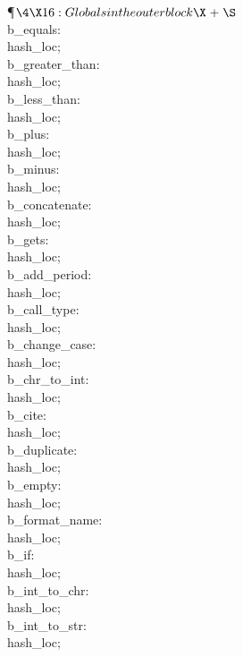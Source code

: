 \Y\P$\4\X16:Globals in the outer block\X\mathrel{+}\S$\6
\4\\{b\_equals}: \\{hash\_loc};\C{\.{=}}\6
\4\\{b\_greater\_than}: \\{hash\_loc};\C{\.{>}}\6
\4\\{b\_less\_than}: \\{hash\_loc};\C{\.{<}}\6
\4\\{b\_plus}: \\{hash\_loc};\6
\4\\{b\_minus}: \\{hash\_loc};\C{\.{-}}\6
\4\\{b\_concatenate}: \\{hash\_loc};\C{\.{*}}\6
\4\\{b\_gets}: \\{hash\_loc};\6
\4\\{b\_add\_period}: \\{hash\_loc};\6
\4\\{b\_call\_type}: \\{hash\_loc};\6
\4\\{b\_change\_case}: \\{hash\_loc};\6
\4\\{b\_chr\_to\_int}: \\{hash\_loc};\6
\4\\{b\_cite}: \\{hash\_loc};\6
\4\\{b\_duplicate}: \\{hash\_loc};\6
\4\\{b\_empty}: \\{hash\_loc};\6
\4\\{b\_format\_name}: \\{hash\_loc};\6
\4\\{b\_if}: \\{hash\_loc};\6
\4\\{b\_int\_to\_chr}: \\{hash\_loc};\6
\4\\{b\_int\_to\_str}: \\{hash\_loc};\6
